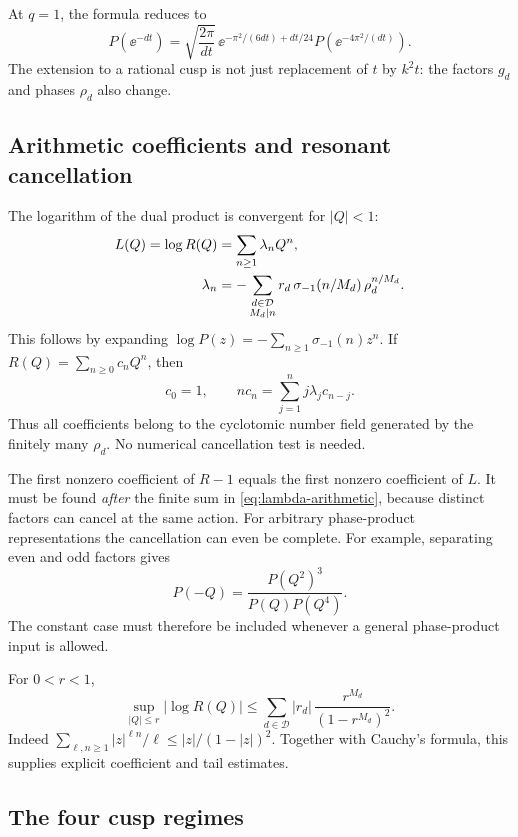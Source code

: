 At \(q=1\), the formula reduces to
\[
 P(\ee^{-dt})=
 \sqrt{\frac{2\pi}{dt}}\,
 \ee^{-\pi^2/(6dt)+dt/24}
 P(\ee^{-4\pi^2/(dt)}).
\]
The extension to a rational cusp is not just replacement of
\(t\) by \(k^2t\): the factors \(g_d\) and phases \(\rho_d\)
also change.

\subsection{Arithmetic coefficients and resonant cancellation}

The logarithm of the dual product is convergent for \(|Q|<1\):
\begin{align}
 L(Q)=\log R(Q)&=\sum_{n\ge1}\lambda_nQ^n,\notag\\
 \lambda_n&=
 -\sum_{\substack{d\in\mathcal D\\M_d\mid n}}
 r_d\,\sigma_{-1}(n/M_d)\,\rho_d^{n/M_d}.
 \label{eq:lambda-arithmetic}
\end{align}
This follows by expanding
\(\log P(z)=-\sum_{n\ge1}\sigma_{-1}(n)z^n\).
If \(R(Q)=\sum_{n\ge0}c_nQ^n\), then
\begin{equation}\label{eq:euler-recurrence}
 c_0=1,\qquad
 nc_n=\sum_{j=1}^n j\lambda_jc_{n-j}.
\end{equation}
Thus all coefficients belong to the cyclotomic number field generated
by the finitely many \(\rho_d\).
No numerical cancellation test is needed.

The first nonzero coefficient of \(R-1\) equals the first nonzero
coefficient of \(L\).  It must be found \emph{after} the finite sum
in \cref{eq:lambda-arithmetic}, because distinct factors can cancel
at the same action.
For arbitrary phase-product representations the cancellation can
even be complete.  For example, separating even and odd factors gives
\[
 P(-Q)=\frac{P(Q^2)^3}{P(Q)P(Q^4)}.
\]
The constant case must therefore be included whenever a general
phase-product input is allowed.

For \(0<r<1\),
\begin{equation}\label{eq:log-product-bound}
 \sup_{|Q|\le r}|\log R(Q)|
 \le \sum_{d\in\mathcal D}|r_d|\,
            \frac{r^{M_d}}{(1-r^{M_d})^2}.
\end{equation}
Indeed
\(\sum_{\ell,n\ge1}|z|^{\ell n}/\ell
 \le |z|/(1-|z|)^2\).
Together with Cauchy's formula, this supplies explicit coefficient
and tail estimates.

\subsection{The four cusp regimes}

